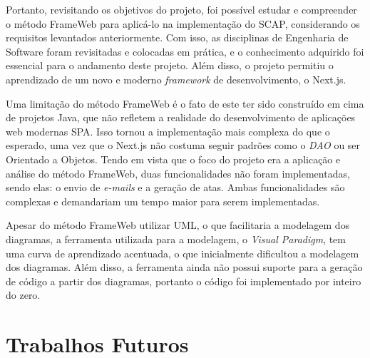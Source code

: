 Portanto, revisitando os objetivos do projeto, foi possível estudar e compreender o método FrameWeb para aplicá-lo na implementação do SCAP, considerando os requisitos levantados anteriormente.
Com isso, as disciplinas de Engenharia de Software foram revisitadas e colocadas em prática, e o conhecimento adquirido foi essencial para o andamento deste projeto.
Além disso, o projeto permitiu o aprendizado de um novo e moderno \textit{framework} de desenvolvimento, o Next.js.


Uma limitação do método FrameWeb é o fato de este ter sido construído em cima de projetos Java, que não refletem a realidade do desenvolvimento de aplicações web modernas
SPA. Isso tornou a implementação mais complexa do que o esperado, uma vez que o Next.js não costuma seguir padrões como o \textit{DAO} ou ser Orientado a Objetos.
Tendo em vista que o foco do projeto era a aplicação e análise do método FrameWeb, duas funcionalidades não foram implementadas,
sendo elas: o envio de \textit{e-mails} e a geração de atas. Ambas funcionalidades são complexas e demandariam um tempo maior para serem implementadas.


Apesar do método FrameWeb utilizar UML, o que facilitaria a modelagem dos diagramas, a ferramenta utilizada para a modelagem, o \textit{Visual Paradigm}, 
tem uma curva de aprendizado acentuada, o que inicialmente dificultou a modelagem dos diagramas. Além disso, a ferramenta ainda não possui suporte para a geração de código
a partir dos diagramas, portanto o código foi implementado por inteiro do zero.



\section{Trabalhos Futuros}
\label{sec-conclusoes-trabalhosfuturos}

